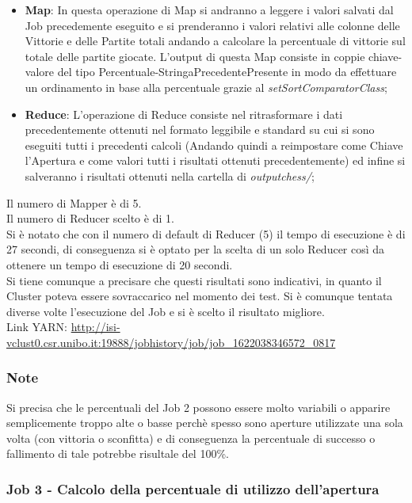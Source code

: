 \documentclass[10pt]{article}
\begin{document}
\begin{itemize}
    \item \textbf{Map}: In questa operazione di Map si andranno a leggere i valori salvati dal Job precedemente eseguito e si prenderanno i valori relativi alle colonne delle Vittorie e delle Partite totali andando a calcolare la percentuale di vittorie sul totale delle partite giocate. L'output di questa Map consiste in coppie chiave-valore del tipo Percentuale-StringaPrecedentePresente in modo da effettuare un ordinamento in base alla percentuale grazie al \textit{setSortComparatorClass};
    \item \textbf{Reduce}: L'operazione di Reduce consiste nel ritrasformare i dati precedentemente ottenuti nel formato leggibile e standard su cui si sono eseguiti tutti i precedenti calcoli (Andando quindi a reimpostare come Chiave l'Apertura e come valori tutti i risultati ottenuti precedentemente) ed infine si salveranno i risultati ottenuti nella cartella di \textit{outputchess/};
\end{itemize}
Il numero di Mapper \`e di 5.\\
Il numero di Reducer scelto \`e di 1.\\
Si \`e notato che con il numero di default di Reducer (5) il tempo di esecuzione \`e di 27 secondi, di conseguenza si \`e optato per la scelta di un solo Reducer cos\`i da ottenere un tempo di esecuzione di 20 secondi.\\
Si tiene comunque a precisare che questi risultati sono indicativi, in quanto il Cluster poteva essere sovraccarico nel momento dei test. Si \`e comunque tentata diverse volte l'esecuzione del Job e si \`e scelto il risultato migliore.\\
Link YARN: \url{http://isi-vclust0.csr.unibo.it:19888/jobhistory/job/job_1622038346572_0817}

\subsubsection{Note}

Si precisa che le percentuali del Job 2 possono essere molto variabili o apparire semplicemente troppo alte o basse perch\`e spesso sono aperture utilizzate una sola volta (con vittoria o sconfitta) e di conseguenza la percentuale di successo o fallimento di tale potrebbe risultale del 100\%.

\subsubsection{Job 3 - Calcolo della percentuale di utilizzo dell'apertura}
\end{document}
